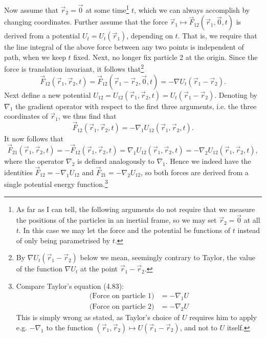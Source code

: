 \documentclass[article, a4paper, 11pt, oneside]{memoir}
\numberwithin{equation}{chapter}
\newcommand{\grad}{\nabla}
\begin{document}
Now assume that $\vec{r}_2 = \vec{0}$ at some time\footnote{As far as I can tell, the following arguments do not require that we measure the positions of the particles in an inertial frame, so we may set $\vec{r}_2 = \vec{0}$ at all $t$. In this case we may let the force and the potential be functions of $t$ instead of only being parametrised by $t$.} $t$, which we can always accomplish by changing coordinates. Further assume that the force $\vec{r}_1 \mapsto \vec{F}_{12}(\vec{r}_1, \vec{0}, t)$ is derived from a potential $U_t = U_t(\vec{r}_1)$, depending on $t$. That is, we require that the line integral of the above force between any two points is independent of path, when we keep $t$ fixed. Next, no longer fix particle 2 at the origin. Since the force is translation invariant, it follows that\footnote{By $\grad U_t(\vec{r}_1 - \vec{r}_2)$ below we mean, seemingly contrary to Taylor, the value of the function $\grad U_t$ at the point $\vec{r}_1 - \vec{r}_2$.}
%
\begin{equation*}
    \vec{F}_{12}(\vec{r}_1, \vec{r}_2, t)
        = \vec{F}_{12}(\vec{r}_1 - \vec{r}_2, \vec{0}, t)
        = -\grad U_t(\vec{r}_1 - \vec{r}_2).
\end{equation*}
%
Next define a new potential $U_{12} = U_{12}(\vec{r}_1, \vec{r}_{2}, t) = U_t(\vec{r}_1 - \vec{r}_2)$. Denoting by $\grad_1$ the gradient operator with respect to the first three arguments, i.e. the three coordinates of $\vec{r}_1$, we thus find that
%
\begin{equation*}
    \vec{F}_{12}(\vec{r}_1, \vec{r}_2, t)
        = -\grad_1 U_{12}(\vec{r}_1, \vec{r}_2, t).
\end{equation*}
%
It now follows that
%
\begin{equation*}
    \vec{F}_{21}(\vec{r}_1, \vec{r}_2, t)
        = -\vec{F}_{12}(\vec{r}_1, \vec{r}_2, t)
        = \grad_1 U_{12}(\vec{r}_1, \vec{r}_2, t)
        = -\grad_2 U_{12}(\vec{r}_1, \vec{r}_2, t),
\end{equation*}
%
where the operator $\grad_2$ is defined analogously to $\grad_1$. Hence we indeed have the identities $\vec{F}_{12} = -\grad_1 U_{12}$ and $\vec{F}_{21} = -\grad_2 U_{12}$, so both forces are derived from a single potential energy function.\footnote{Compare Taylor's equation (4.83):
%
\begin{align*}
    \text{(Force on particle 1)} &= -\grad_1 U \\
    \text{(Force on particle 2)} &= -\grad_2 U
\end{align*}
%
This is simply wrong as stated, as Taylor's choice of $U$ requires him to apply e.g. $-\grad_1$ to the function $(\vec{r}_1, \vec{r}_2) \mapsto U(\vec{r}_1 - \vec{r}_2)$, and not to $U$ itself.}
\end{document}
